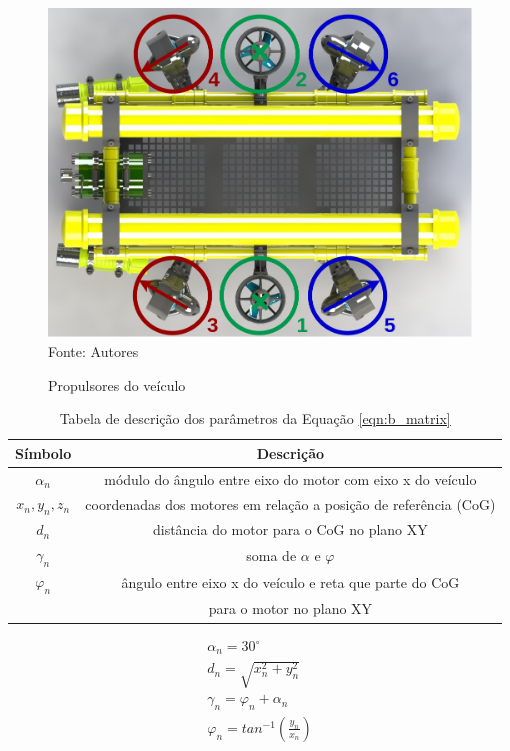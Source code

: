 \begin{figure}[H]
	\centering
	\caption{Propulsores do veículo}
	\label{fig:propellers}
	\includegraphics[width=0.8\linewidth]{images/brov_propulsion.png}\\
	\footnotesize Fonte: Autores
\end{figure}

\begin{table}[H]
	\centering
	\label{tab:aux_terms_desc}
	\caption{Tabela de descrição dos parâmetros da Equação \ref{eqn:b_matrix}}
	\begin{tabular}{ | c | c | } 
		\hline
		\textbf{Símbolo} & \textbf{Descrição}\\
		\hline
		$\alpha_n $ & módulo do ângulo entre eixo do motor com eixo x do veículo\\ 
		\hline
		$x_n, y_n, z_n $ & coordenadas dos motores em relação a posição de referência (CoG) \\ 
		\hline
		$d_n$ & distância do motor para o CoG no plano XY\\ 
		\hline
		$\gamma_n$ & soma de $\alpha$ e $\varphi$\\ 
		\hline
		$\varphi_n$ &  ângulo entre eixo x do veículo e reta que parte do CoG \\  & para o motor no plano XY \\
		\hline
	\end{tabular}
\end{table}

\begin{equation}
	\label{eqn:aux_terms_eqn}
	\begin{aligned} 
		\alpha_n = 30^{\circ} \\
		d_n = \sqrt{x_n^{2} + y_n^{2}} \\
		\gamma_n = \varphi_n + \alpha_n \\
		\varphi_n = tan^{-1}(\frac{y_n}{x_n}) 
	\end{aligned}
\end{equation}

